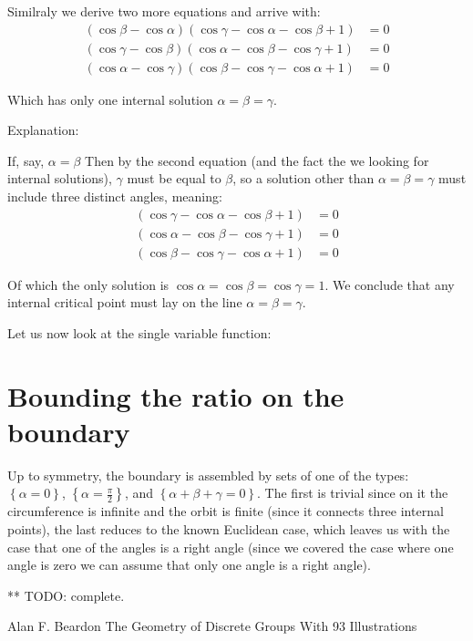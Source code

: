 \documentclass[a4paper,10pt]{article}
\begin{document}
Similraly we derive two more equations and arrive with:
\begin{align*}
\left(\cos{\beta} - \cos{\alpha}\right)\left(\cos{\gamma} - \cos{\alpha} - \cos{\beta} + 1\right) &=0\\
\left(\cos{\gamma} - \cos{\beta}\right)\left(\cos{\alpha} - \cos{\beta} - \cos{\gamma} + 1\right) &=0\\
\left(\cos{\alpha} - \cos{\gamma}\right)\left(\cos{\beta} - \cos{\gamma} - \cos{\alpha} + 1\right) &=0
\end{align*}

Which has only one internal solution $\alpha=\beta=\gamma$.

Explanation:

If, say, $\alpha=\beta$ Then by the second equation (and the fact the we looking for internal solutions), $\gamma$ must
be equal to $\beta$, so a solution other than $\alpha=\beta=\gamma$ must include three distinct angles, meaning:
\begin{align*}
\left(\cos{\gamma} - \cos{\alpha} - \cos{\beta} + 1\right) &=0\\
\left(\cos{\alpha} - \cos{\beta} - \cos{\gamma} + 1\right) &=0\\
\left(\cos{\beta} - \cos{\gamma} - \cos{\alpha} + 1\right) &=0
\end{align*}

Of which the only solution is $\cos{\alpha}=\cos{\beta}=\cos{\gamma}=1$.
We conclude that any internal critical point must lay on the line $\alpha=\beta=\gamma$.

Let us now look at the single variable function:


\section{Bounding the ratio on the boundary}

Up to symmetry, the boundary is assembled by sets of one of the types: 
$\left\{\alpha=0\right\}$, $\left\{\alpha=\frac{\pi}{2}\right\}$, and
$\left\{\alpha+\beta+\gamma=0\right\}$. The first is trivial since on it the
circumference is infinite and the orbit is finite (since it connects
three internal points), the last reduces to the known Euclidean case,
which leaves us with the case that one of the angles is a right
angle (since we covered the case where one angle is zero we can assume
that only one angle is a right angle).

** TODO: complete.

\begin{thebibliography}{9}

  Alan F. Beardon
  The Geometry
  of Discrete Groups
  With 93 Illustrations

\end{thebibliography}
\end{document}
